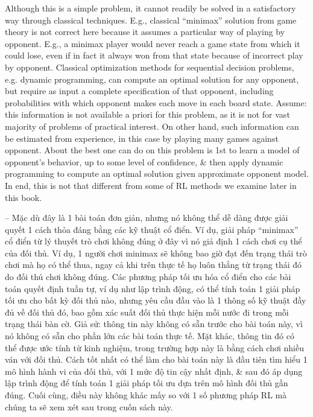 \documentclass{article}
\begin{document}
\begin{itemize}
\begin{itemize}
        Although this is a simple problem, it cannot readily be solved in a satisfactory way through classical techniques. E.g., classical ``minimax'' solution from game theory is not correct here because it assumes a particular way of playing by opponent. E.g., a minimax player would never reach a game state from which it could lose, even if in fact it always won from that state because of incorrect play by opponent. Classical optimization methods for sequential decision problems, e.g. dynamic programming, can compute an optimal solution for any opponent, but require as input a complete specification of that opponent, including probabilities with which opponent makes each move in each board state. Assume: this information is not available a priori for this problem, as it is not for vast majority of problems of practical interest. On other hand, such information can be estimated from experience, in this case by playing many games against opponent. About the best one can do on this problem is 1st to learn a model of opponent's behavior, up to some level of confidence, \& then apply dynamic programming to compute an optimal solution given approximate opponent model. In end, this is not that different from some of RL methods we examine later in this book.

        -- Mặc dù đây là 1 bài toán đơn giản, nhưng nó không thể dễ dàng được giải quyết 1 cách thỏa đáng bằng các kỹ thuật cổ điển. Ví dụ, giải pháp ``minimax'' cổ điển từ lý thuyết trò chơi không đúng ở đây vì nó giả định 1 cách chơi cụ thể của đối thủ. Ví dụ, 1 người chơi minimax sẽ không bao giờ đạt đến trạng thái trò chơi mà họ có thể thua, ngay cả khi trên thực tế họ luôn thắng từ trạng thái đó do đối thủ chơi không đúng. Các phương pháp tối ưu hóa cổ điển cho các bài toán quyết định tuần tự, ví dụ như lập trình động, có thể tính toán 1 giải pháp tối ưu cho bất kỳ đối thủ nào, nhưng yêu cầu đầu vào là 1 thông số kỹ thuật đầy đủ về đối thủ đó, bao gồm xác suất đối thủ thực hiện mỗi nước đi trong mỗi trạng thái bàn cờ. Giả sử: thông tin này không có sẵn trước cho bài toán này, vì nó không có sẵn cho phần lớn các bài toán thực tế. Mặt khác, thông tin đó có thể được ước tính từ kinh nghiệm, trong trường hợp này là bằng cách chơi nhiều ván với đối thủ. Cách tốt nhất có thể làm cho bài toán này là đầu tiên tìm hiểu 1 mô hình hành vi của đối thủ, với 1 mức độ tin cậy nhất định, \& sau đó áp dụng lập trình động để tính toán 1 giải pháp tối ưu dựa trên mô hình đối thủ gần đúng. Cuối cùng, điều này không khác mấy so với 1 số phương pháp RL mà chúng ta sẽ xem xét sau trong cuốn sách này.


\end{itemize}
\end{itemize}
\end{document}
